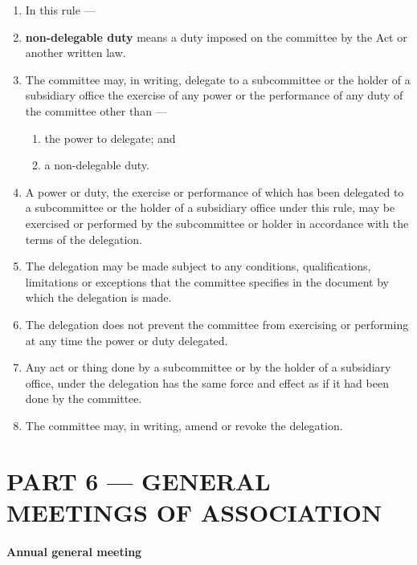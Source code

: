 \documentclass[../constitution.tex]{subfiles}
\begin{document}
\begin{enumerate}

\item In this rule ---
\item \textbf{non-delegable duty} means a duty imposed on the committee by the Act or another written law.
\item The committee may, in writing, delegate to a subcommittee or the holder of a subsidiary office the exercise of any power or the performance of any duty of the committee other than ---

  \begin{enumerate}
  
  \item the power to delegate; and
  \item a non-delegable duty.
  \end{enumerate}
\item A power or duty, the exercise or performance of which has been delegated to a subcommittee or the holder of a subsidiary office under this rule, may be exercised or performed by the subcommittee or holder in accordance with the terms of the delegation.
\item The delegation may be made subject to any conditions, qualifications, limitations or exceptions that the committee specifies in the document by which the delegation is made.
\item The delegation does not prevent the committee from exercising or performing at any time the power or duty delegated.
\item Any act or thing done by a subcommittee or by the holder of a subsidiary office, under the delegation has the same force and effect as if it had been done by the committee.
\item The committee may, in writing, amend or revoke the delegation.
\end{enumerate}

\hypertarget{part-6-general-meetings-of-association}{%
\part{PART 6 --- GENERAL MEETINGS OF ASSOCIATION}\label{part-6-general-meetings-of-association}}

\hypertarget{annual-general-meeting}{%
\subsection{Annual general meeting}\label{annual-general-meeting}}
\end{document}
